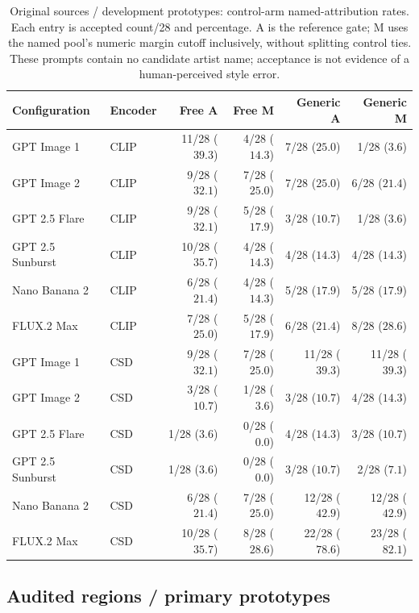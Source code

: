 \begin{table}[!htbp]
\caption{Original sources / development prototypes: control-arm named-attribution rates. Each entry is accepted count/28 and percentage. A is the reference gate; M uses the named pool's numeric margin cutoff inclusively, without splitting control ties. These prompts contain no candidate artist name; acceptance is not evidence of a human-perceived style error.}
\label{tab:selective-controls-original-development}
\centering\footnotesize\setlength{\tabcolsep}{3pt}
\begin{tabularx}{\linewidth}{@{}Xlrrrr@{}}\toprule
Configuration & Encoder & Free A & Free M & Generic A & Generic M\\\midrule
GPT Image 1 & CLIP & 11/28 ($39.3$) & 4/28 ($14.3$) & 7/28 ($25.0$) & 1/28 ($3.6$)\\
GPT Image 2 & CLIP & 9/28 ($32.1$) & 7/28 ($25.0$) & 7/28 ($25.0$) & 6/28 ($21.4$)\\
GPT 2.5 Flare & CLIP & 9/28 ($32.1$) & 5/28 ($17.9$) & 3/28 ($10.7$) & 1/28 ($3.6$)\\
GPT 2.5 Sunburst & CLIP & 10/28 ($35.7$) & 4/28 ($14.3$) & 4/28 ($14.3$) & 4/28 ($14.3$)\\
Nano Banana 2 & CLIP & 6/28 ($21.4$) & 4/28 ($14.3$) & 5/28 ($17.9$) & 5/28 ($17.9$)\\
FLUX.2 Max & CLIP & 7/28 ($25.0$) & 5/28 ($17.9$) & 6/28 ($21.4$) & 8/28 ($28.6$)\\
GPT Image 1 & CSD & 9/28 ($32.1$) & 7/28 ($25.0$) & 11/28 ($39.3$) & 11/28 ($39.3$)\\
GPT Image 2 & CSD & 3/28 ($10.7$) & 1/28 ($3.6$) & 3/28 ($10.7$) & 4/28 ($14.3$)\\
GPT 2.5 Flare & CSD & 1/28 ($3.6$) & 0/28 ($0.0$) & 4/28 ($14.3$) & 3/28 ($10.7$)\\
GPT 2.5 Sunburst & CSD & 1/28 ($3.6$) & 0/28 ($0.0$) & 3/28 ($10.7$) & 2/28 ($7.1$)\\
Nano Banana 2 & CSD & 6/28 ($21.4$) & 7/28 ($25.0$) & 12/28 ($42.9$) & 12/28 ($42.9$)\\
FLUX.2 Max & CSD & 10/28 ($35.7$) & 8/28 ($28.6$) & 22/28 ($78.6$) & 23/28 ($82.1$)\\
\bottomrule\end{tabularx}
\end{table}
\FloatBarrier
\clearpage\subsection{Audited regions / primary prototypes}
